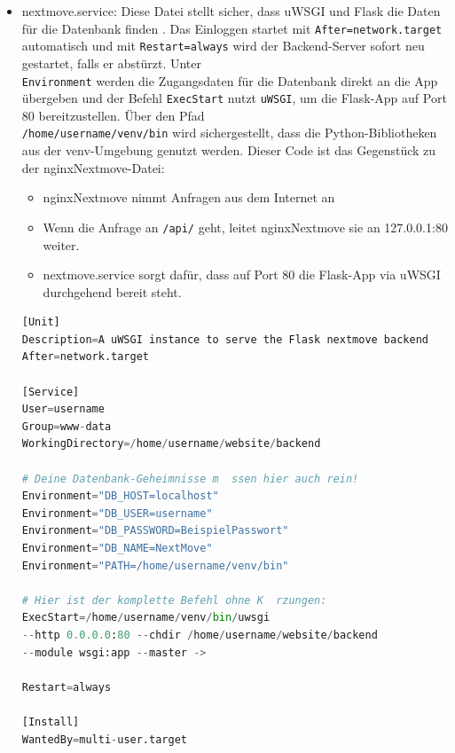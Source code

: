 \begin{itemize}
\begin{scriptsize}
\begin{lstlisting}[style=Python, language=Python, captionpos=b, stepnumber=5, caption = {nginxNextmove}]
        location /api/ {
            proxy_pass http://127.0.0.1:5000/;
            proxy_set_header Host $host;
            proxy_set_header X-Real-IP $remote_addr;
        }
    }
        \end{lstlisting}
    \end{scriptsize}
    \item nextmove.service: Diese Datei stellt sicher, dass uWSGI und Flask die Daten für die 
    Datenbank finden \cite{uWSGI}. Das Einloggen startet mit \texttt{After=network.target} 
    automatisch und mit \texttt{Restart=always} wird der Backend-Server sofort neu gestartet, 
    falls er abstürzt. Unter \\\texttt{Environment} werden die Zugangsdaten für die Datenbank 
    direkt an die App übergeben und der Befehl \texttt{ExecStart} nutzt \texttt{uWSGI}, um die 
    Flask-App auf Port 80 bereitzustellen. Über den Pfad \\\texttt{/home/username/venv/bin} 
    wird sichergestellt, dass die Python-Bibliotheken aus der venv-Umgebung genutzt werden. 
    Dieser Code ist das \glqq{}Gegenstück\grqq{} zu der nginxNextmove-Datei: 
    \begin{itemize}
        \item nginxNextmove nimmt Anfragen aus dem Internet an
        \item Wenn die Anfrage an \texttt{/api/} geht, leitet nginxNextmove sie an 127.0.0.1:80 
        weiter.
        \item nextmove.service sorgt dafür, dass auf Port 80 die Flask-App via uWSGI durchgehend 
        bereit steht. 
    \end{itemize}
    \begin{scriptsize}
        \begin{lstlisting}[style=Python, language=Python, captionpos=b, stepnumber=5, caption = {nextmove.service}]
[Unit]
Description=A uWSGI instance to serve the Flask nextmove backend
After=network.target

[Service]
User=username
Group=www-data
WorkingDirectory=/home/username/website/backend

# Deine Datenbank-Geheimnisse m  ssen hier auch rein!
Environment="DB_HOST=localhost"
Environment="DB_USER=username"
Environment="DB_PASSWORD=BeispielPasswort"
Environment="DB_NAME=NextMove"
Environment="PATH=/home/username/venv/bin"

# Hier ist der komplette Befehl ohne K  rzungen:
ExecStart=/home/username/venv/bin/uwsgi 
--http 0.0.0.0:80 --chdir /home/username/website/backend 
--module wsgi:app --master ->

Restart=always

[Install]
WantedBy=multi-user.target
        \end{lstlisting}
    \end{scriptsize}
\end{itemize}

